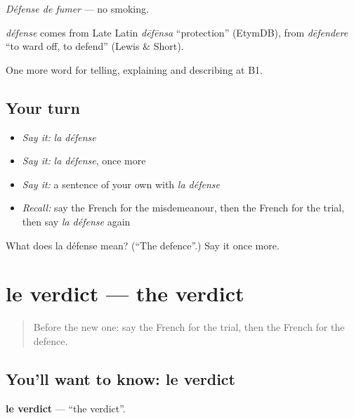 \emph{Défense de fumer} — no smoking.

\begin{cousinweb}
\emph{défense} comes from Late Latin \emph{dēfēnsa} \textquotedblleft{}protection\textquotedblright{} (EtymDB), from \emph{dēfendere} \textquotedblleft{}to ward off, to defend\textquotedblright{} (Lewis \& Short).
\end{cousinweb}

\begin{grammarlens}[title={What you've built}]
One more word for telling, explaining and describing at B1.
\end{grammarlens}

\subsection*{Your turn}
\begin{itemize}
\raggedright
  \item \emph{Say it:} \emph{la défense}
  \item \emph{Say it:} \emph{la défense}, once more
  \item \emph{Say it:} a sentence of your own with \emph{la défense}
  \item \emph{Recall:} say the French for the misdemeanour, then the French for the trial, then say \emph{la défense} again
\end{itemize}

\begin{tcolorbox}[breakable,colback=teal!4,colframe=teal!35!black,title={Before you move on}]
What does la défense mean? (\textquotedblleft{}The defence\textquotedblright{}.) Say it once more.
\end{tcolorbox}
\section[le verdict]{le verdict — the verdict}

\label{lesson:FR-C387-verdict}



\begin{quote}
Before the new one: say the French for the trial, then the French for the defence.
\end{quote}

\subsection*{You'll want to know: le verdict}
\textbf{le verdict} — \textquotedblleft{}the verdict\textquotedblright{}.

